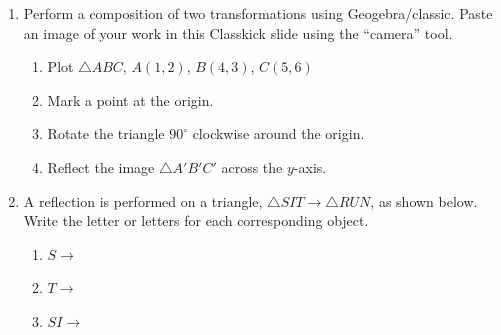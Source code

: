 \begin{enumerate}
\item Perform a composition of two transformations using Geogebra/classic. Paste an image of your work in this Classkick slide using the ``camera'' tool.
  \begin{enumerate}
    \item Plot $\triangle ABC$, $A(1,2)$, $B(4,3)$, $C(5,6)$
    \item Mark a point at the origin.
    \item Rotate the triangle $90^\circ$ clockwise around the origin.
    \item Reflect the image $\triangle A'B'C'$ across the $y$-axis.
  \end{enumerate}          

\item A reflection is performed on a triangle, $\triangle SIT \rightarrow \triangle RUN$, as shown below. \\[0.5cm]
Write the letter or letters for each corresponding object. \vspace{0.5cm}
  \begin{multicols}{2}
  \begin{enumerate}
  \item $S \rightarrow$ \vspace{1.5cm}
  \item $T \rightarrow$ \vspace{1.5cm}
  \item $SI \rightarrow$ \vspace{1.5cm}
  \end{enumerate}
  \end{multicols}



\end{enumerate}
